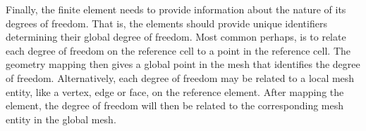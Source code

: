 Finally, the finite element needs to provide information about the nature of its degrees of freedom. 
That is, the elements should provide unique identifiers determining their global degree of freedom. 
Most common perhaps, is to relate each degree of freedom on the reference cell to a point in the
reference cell. The geometry mapping then gives a global point in the mesh that identifies the degree of freedom. Alternatively, each degree of freedom may be related to a local mesh entity, like a vertex, edge or face, on the reference element. After mapping the element, the degree of freedom will then be related to the corresponding mesh entity in the global mesh.      


